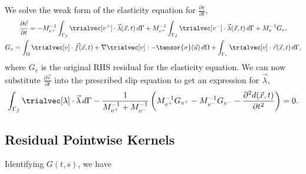 We solve the weak form of the elasticity equation for $\frac{\partial v}{\partial t}$,
\begin{gather}
  \frac{\partial \vec{v}}{\partial t} =
  - M_{v^+}^{-1} \int_{\Gamma_{f}} \trialvec[v^+] \cdot \vec{\lambda}(\vec{x},t) \, d\Gamma
  + M_{v^-}^{-1} \int_{\Gamma_{f}}\trialvec[v^-] \cdot \vec{\lambda}(\vec{x},t) \, d\Gamma 
  + M_v^{-1} G_v, \\
  G_v = \int_\Omega \trialvec[v] \cdot \vec{f}(\vec{x},t) + \nabla \trialvec[v] : -\tensor{\sigma}(\vec{u}) \, d\Omega
  + \int_{\Gamma_\tau} \trialvec[v] \cdot \vec{\tau}(\vec{x},t) \, d\Gamma,
\end{gather}
where $G_v$ is the original RHS residual for the elasticity
equation. We can now substitute $\frac{\partial \vec{v}}{\partial t}$
into the prescribed slip equation to get an expression for $\vec{\lambda}$,
\begin{equation}
  \int_{\Gamma_f} \trialvec[\lambda] \cdot \vec{\lambda} \, d\Gamma -
  \frac{1}{M_{v^+}^{-1} + M_{v^-}^{-1}} \left( M_{v^+}^{-1} G_{v^+} - M_{v^-}^{-1} G_{v^-}
    - \frac{\partial^2 d(\vec{x},t)}{\partial t^2} \right) = 0.
\end{equation}


\subsection{Residual Pointwise Kernels}

Identifying $G(t,s)$, we have



